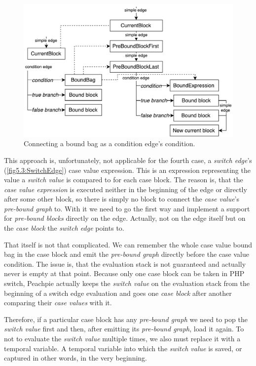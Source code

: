 \begin{figure}[H]
	\centering	
	\includegraphics[scale=0.70]{../img/5_3_newInIfEdge}	
	\caption{Connecting a bound bag as a condition edge's condition.}
	\label{fig5.3:BindIfEdge}
\end{figure}

This approach is, unfortunately, not applicable for the fourth case, a \emph{switch edge}’s (\autoref{fig5.3:SwitchEdge}) case value expression. This is an expression representing the value a \emph{switch value} is compared to for each case block. The reason is, that the \emph{case value expression} is executed neither in the beginning of the edge or directly after some other block, so there is simply no block to connect the \emph{case value}’s \emph{pre-bound graph} to. With it we need to go the first way and implement a support for \emph{pre-bound blocks} directly on the edge. Actually, not on the edge itself but on the \emph{case block} the \emph{switch edge} points to.

That itself is not that complicated. We can remember the whole case value bound bag in the case block and emit the \emph{pre-bound graph} directly before the case value condition. The issue is, that the evaluation stack is not guaranteed and actually never is empty at that point. Because only one case block can be taken in PHP switch, Peachpie actually keeps the \emph{switch value} on the evaluation stack from the beginning of a switch edge evaluation and goes one \emph{case block} after another comparing their \emph{case values} with it.

Therefore, if a particular case block has any \emph{pre-bound graph} we need to pop the \emph{switch value} first and then, after emitting its \emph{pre-bound graph}, load it again. To not to evaluate the \emph{switch value} multiple times, we also must replace it with a temporal variable. A temporal variable into which the \emph{switch value} is saved, or captured in other words, in the very beginning.


